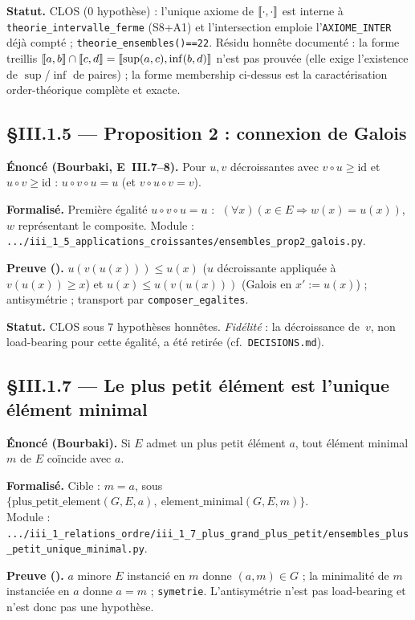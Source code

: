 \textbf{Statut.} CLOS (0 hypothèse) : l'unique axiome de $\llbracket \cdot, \cdot \rrbracket$ est interne à \texttt{theorie\_intervalle\_ferme} (S8+A1) et l'intersection emploie l'\texttt{AXIOME\_INTER} déjà compté ; \texttt{theorie\_ensembles()==22}. Résidu honnête documenté : la forme treillis $\llbracket a, b \rrbracket\cap\llbracket c, d \rrbracket=\llbracket \sup(a,c), \inf(b,d) \rrbracket$ n'est pas prouvée (elle exige l'existence de $\sup$/$\inf$ de paires) ; la forme membership ci-dessus est la caractérisation order-théorique complète et exacte.

\subsection{§III.1.5 --- Proposition 2 : connexion de Galois}
\textbf{Énoncé (Bourbaki, E~III.7--8).} Pour $u,v$ décroissantes avec $v\circ u\geq\mathrm{id}$
et $u\circ v\geq\mathrm{id}$ : $u\circ v\circ u = u$ (et $v\circ u\circ v = v$).

\textbf{Formalisé.} Première égalité $u\circ v\circ u=u$ : $\;(\forall x)(x\in E\Rightarrow w(x)=u(x))$,
$w$ représentant le composite. Module :
\texttt{.../iii\_1\_5\_applications\_croissantes/ensembles\_prop2\_galois.py}.

\textbf{Preuve (\Nstar).} $u(v(u(x)))\leq u(x)$ ($u$ décroissante appliquée à $v(u(x))\geq x$)
et $u(x)\leq u(v(u(x)))$ (Galois en $x'{:=}u(x)$) ; antisymétrie ; transport par
\texttt{composer\_egalites}.

\textbf{Statut.} CLOS sous $7$ hypothèses honnêtes. \emph{Fidélité} : la décroissance
de~$v$, non load-bearing pour cette égalité, a été retirée (cf.\ \texttt{DECISIONS.md}).

\subsection{§III.1.7 --- Le plus petit élément est l'unique élément minimal}
\textbf{Énoncé (Bourbaki).} Si $E$ admet un plus petit élément $a$, tout élément
minimal $m$ de $E$ coïncide avec $a$.

\textbf{Formalisé.} Cible : $m=a$, sous
$\{\mathrm{plus\_petit\_element}(G,E,a),\ \mathrm{element\_minimal}(G,E,m)\}$. \\
Module : \texttt{.../iii\_1\_relations\_ordre/iii\_1\_7\_plus\_grand\_plus\_petit/ensembles\_plus\_petit\_unique\_minimal.py}.

\textbf{Preuve (\Nstar).} $a$ minore $E$ instancié en $m$ donne $(a,m)\in G$ ; la
minimalité de $m$ instanciée en $a$ donne $a=m$ ; \texttt{symetrie}. L'antisymétrie
n'est pas load-bearing et n'est donc pas une hypothèse.

